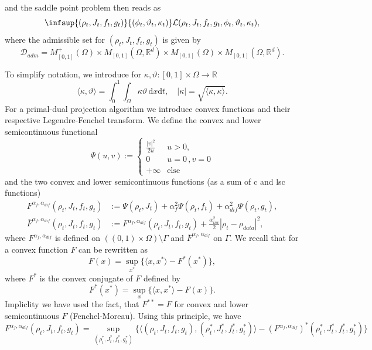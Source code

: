  and the saddle point problem then reads as 
 $$
 \infsup{(\rho_t,J_t,f_t,g_t)}{(\phi_t,\vartheta_t, \kappa_t)} \mathcal{L}(\rho_t,J_t,f_t,g_t,\phi_t,\vartheta_t, \kappa_t),
 $$
where the admissible set for $(\rho_t, J_t, f_t,g_t)$ is given by 
$$
\mathcal{D}_{adm} = M_{[0,1]}^+(\Omega) \times M_{[0,1]}(\Omega, \mathbb{R}^d)\times M_{[0,1]}(\Omega)\times M_{[0,1]}(\Omega, \mathbb{R}^d).
$$

 To simplify notation, we introduce for $\kappa, \vartheta : [0,1]\times\Omega\to \mathbb{R}$
 $$
 \langle \kappa,\vartheta\rangle = \int_0^1\int_\Omega \kappa\vartheta\,\mathrm{d}x\mathrm{d}t,\quad |\kappa| = \sqrt{\langle \kappa,\kappa\rangle}.
 $$
 For a primal-dual projection algorithm we introduce convex functions and their respective Legendre-Fenchel transform. We define the convex and lower semicontinuous functional
 $$
 \Psi(u,v) := \begin{cases} \frac{|v|^2}{2u}& u>0,\\
 0& u=0\,, v= 0\\
+\infty&\text{else}\end{cases}
 $$
 and the two convex and lower semicontinuous functions (as a sum of c and lsc functions)
 \begin{align*}
	 F^{\alpha_f, \alpha_{dif}}(\rho_t, J_t, f_t, g_t) &:= \Psi(\rho_t, J_t)  + \alpha_f^2\Psi(\rho_t, f_t) + \alpha_{dif}^2\Psi(\rho_t,g_t),\\
	 \overline{F}^{\alpha_f,\alpha_{dif}}(\rho_t, J_t, f_t, g_t) &:= F^{\alpha_f,\alpha_{dif}}(\rho_t, J_t, f_t, g_t) + \frac{\alpha_{inv}^2}{2} |\rho_t - \rho_{data}|^2,
 \end{align*}			
 where $F^{\alpha_f, \alpha_{dif}}$ is defined on $((0,1)\times\Omega)\setminus\Gamma$ and $\overline{F}^{\alpha_f, \alpha_{dif}}$ on $\Gamma$. %
 We recall that for a convex function $F$ can be rewritten as %
 $$
 F(x) = \sup_{x^*} \{\langle x,x^*\rangle - F^*(x^*)\},
 $$
 where $F^*$ is the convex conjugate of $F$ defined by 
 $$
 F^*(x^*) = \sup_x \{\langle x,x^*\rangle - F(x)\}.
 $$
 Impliclity we have used the fact, that $F^{**} = F$ for convex and lower semicontinuous $F$ (Fenchel-Moreau).
 Using this principle, we have 
 $$
 F^{\alpha_f,\alpha_{dif}}(\rho_t, J_t, f_t, g_t) = \sup_{(\rho_t^*, J_t^*, f_t^*, g_t^*)} \{\langle (\rho_t, J_t, f_t, g_t), (\rho_t^*, J_t^*, f_t^*, g_t^*)\rangle - (F^{\alpha_f,\alpha_{dif}})^*(\rho_t^*, J_t^*, f_t^*, g_t^*)\}
 $$

